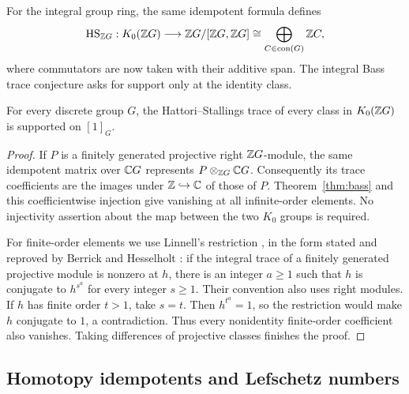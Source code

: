 For the integral group ring, the same idempotent formula defines
\[
 \operatorname{HS}_{\mathbb Z G}:K_0(\mathbb Z G)\longrightarrow
 \mathbb Z G/[\mathbb Z G,\mathbb Z G]\cong\bigoplus_{C\in\operatorname{con}(G)}\mathbb Z C,
\]
where commutators are now taken with their additive span. The integral
Bass trace conjecture asks for support only at the identity class.

\begin{corollary}\label{cor:integral}
For every discrete group $G$, the Hattori--Stallings trace of every
class in $K_0(\mathbb Z G)$ is supported on $[1]_G$.
\end{corollary}

\begin{proof}
If $P$ is a finitely generated projective right $\mathbb Z G$-module, the same
idempotent matrix over $\mathbb C G$ represents $P\otimes_{\mathbb Z G}\mathbb C G$.
Consequently its trace coefficients are the images under
$\mathbb Z\hookrightarrow\mathbb C$ of those of $P$. Theorem~\ref{thm:bass} and this
coefficientwise injection give vanishing at all infinite-order elements.
No injectivity assertion about the map between the two $K_0$ groups is
required.

For finite-order elements we use Linnell's restriction
\cite[Lemma 4.1]{Linnell1983}, in the form stated and reproved by
Berrick and Hesselholt \cite[Theorem A]{BH2015}: if the integral trace of a finitely
generated projective module is nonzero at $h$, there is an integer
$a\geq1$ such that $h$ is conjugate to $h^{s^a}$ for every integer
$s\geq1$. Their convention also uses right modules.
If $h$ has finite order $t>1$, take $s=t$.
Then $h^{t^a}=1$, so the restriction would make $h$ conjugate to $1$,
a contradiction. Thus every nonidentity finite-order coefficient also
vanishes. Taking differences of projective classes finishes the proof.
\end{proof}

\subsection{Homotopy idempotents and Lefschetz numbers}

